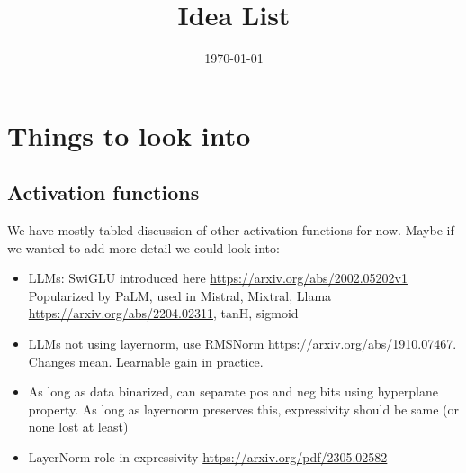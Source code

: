 \documentclass{article}
\title{Idea List}
\date{\today}
\begin{document}
\maketitle
\section{Things to look into}

\subsection{Activation functions}

We have mostly tabled discussion of other activation functions for now. Maybe if we wanted to add more detail we could look into:

\begin{itemize}
    \item LLMs: SwiGLU introduced here \url{https://arxiv.org/abs/2002.05202v1} Popularized by PaLM, used in Mistral, Mixtral, Llama \url{https://arxiv.org/abs/2204.02311}, tanH, sigmoid
    \item LLMs not using layernorm, use RMSNorm \url{https://arxiv.org/abs/1910.07467}. Changes mean. Learnable gain in practice. 
    \item As long as data binarized, can separate pos and neg bits using hyperplane property. As long as layernorm preserves this, expressivity should be same (or none lost at least)
    \item LayerNorm role in expressivity \url{https://arxiv.org/pdf/2305.02582}
\end{itemize}



\end{document}
